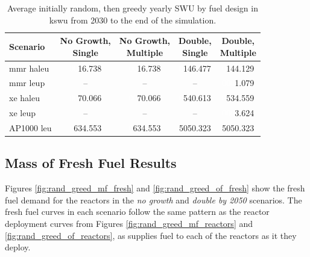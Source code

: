 \begin{table}[H]
    \centering
    \caption{Average initially random, then greedy yearly SWU by fuel design in k\gls{swu} from 2030 to the end of the simulation.}
    \label{tab:rand_greed_swu_avg}
    \begin{tabular}{l c c c c}
       \toprule
       Scenario & \shortstack{No Growth,\\ Single} & \shortstack{No Growth,\\ Multiple} & \shortstack{Double,\\ Single} & \shortstack{Double,\\ Multiple}  \\
       \midrule
       \gls{mmr} \gls{haleu}   & \textcolor{white}{00}16.738  & \textcolor{white}{00}16.738  & \textcolor{white}{0}146.477  & \textcolor{white}{0}144.129  \\
       \gls{mmr} \gls{leup}    & --      & --      & --       & \textcolor{white}{000}1.079    \\
       \gls{xe} \gls{haleu}    & \textcolor{white}{00}70.066  & \textcolor{white}{00}70.066  & \textcolor{white}{0}540.613  & \textcolor{white}{0}534.559  \\
       \gls{xe} \gls{leup}     & --      & --      & --       & \textcolor{white}{000}3.624    \\
       AP1000 \gls{leu}        & \textcolor{white}{0}634.553 & \textcolor{white}{0}634.553 & 5050.323 & 5050.323 \\
       \bottomrule
    \end{tabular}
\end{table}



\subsection{Mass of Fresh Fuel Results}
\label{sec:rand_greed_fresh}

Figures \ref{fig:rand_greed_mf_fresh} and \ref{fig:rand_greed_of_fresh} show the fresh fuel demand for the reactors in the \textit{no growth} and \textit{double by 2050} scenarios. The fresh fuel curves in each scenario follow the same pattern as the reactor deployment curves from Figures \ref{fig:rand_greed_mf_reactors} and \ref{fig:rand_greed_of_reactors}, as \cyclus supplies fuel to each of the reactors as it they deploy.


